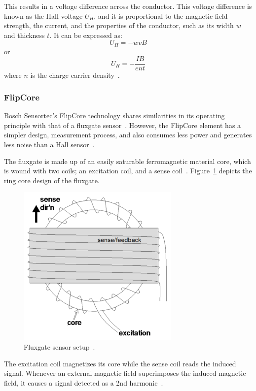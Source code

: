 \documentclass[DIV=14]{scrartcl}
\begin{document}
    This results in a voltage difference across the conductor.
    This voltage difference is known as the Hall voltage $U_H$, and it is proportional to the magnetic field
    strength, the current, and the properties of the conductor, such as its width $w$ and thickness $t$.
    It can be expressed as:
    \begin{equation}
        U_H = -wvB
        \label{eq:hallVoltageWidht}
    \end{equation}
    or
    \begin{equation}
        U_H = -\frac{IB}{ent}
        \label{eq:hallVoltageCurrent}
    \end{equation}
    where $n$ is the charge carrier density~\cite{labManual}.

    \subsubsection{FlipCore}\label{subsubsec:flipcore}
    Bosch Sensortec's FlipCore technology shares similarities in its operating principle with that of a fluxgate sensor~\cite{labManual}.
    However, the FlipCore element has a simpler design, measurement process, and also consumes less power
    and generates less noise than a Hall sensor~\cite{labManual}.

    The fluxgate is made up of an easily saturable ferromagnetic material core, which is wound with two coils;
    an excitation coil, and a sense coil~\cite{fluxGate}.
    Figure~\ref{fig:fluxGate} depicts the ring core design of the fluxgate.

    \begin{figure}[hbt!]
        \centering
        \includegraphics[width=.4\textwidth]{figures/fluxgate}
        \caption{Fluxgate sensor setup~\cite{flixGateImage}.}
        \label{fig:fluxGate}
    \end{figure}

    The excitation coil magnetizes its core while the sense coil reads the induced signal.
    Whenever an external magnetic field superimposes the induced magnetic field, it causes a signal detected as
    a 2nd harmonic~\cite{labManual}.
\end{document}
